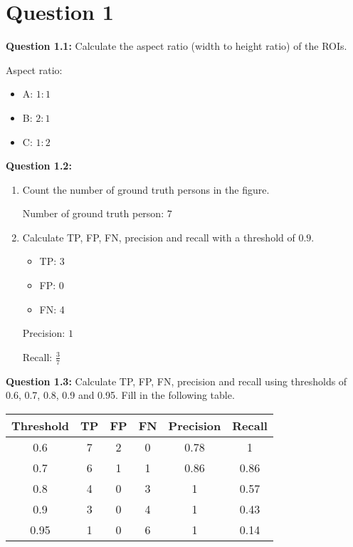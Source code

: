 \documentclass[12pt]{article}
\begin{document}
\maketitle

\section*{Question 1}

\textbf{Question 1.1:} Calculate the aspect ratio (width to height ratio) of the ROIs.

Aspect ratio:
\begin{itemize}
    \item A: $1:1$ 
    \item B: $2:1$
    \item C: $1:2$
\end{itemize}

\textbf{Question 1.2:}
\begin{enumerate}
    \item Count the number of ground truth persons in the figure.
    
    Number of ground truth person: $7$
    
    \item Calculate TP, FP, FN, precision and recall with a threshold of $0.9$.
    \begin{itemize}
        \item TP: 3 
        \item FP: 0 
        \item FN: 4
    \end{itemize}

    Precision: $1$

    Recall: $\frac{3}{7}$
\end{enumerate}

\textbf{Question 1.3:} Calculate TP, FP, FN, precision and recall using thresholds of 0.6, 0.7, 0.8, 0.9 and 0.95. Fill in
the following table.
\begin{table}[h]
    \centering
    \begin{tabular}{|c|c|c|c|c|c|}
    \hline
    Threshold & TP & FP & FN & Precision & Recall \\ \hline
    0.6       & 7  & 2  & 0  & 0.78      & 1      \\ \hline
    0.7       & 6  & 1  & 1  & 0.86      & 0.86   \\ \hline
    0.8       & 4  & 0  & 3  & 1         & 0.57   \\ \hline
    0.9       & 3  & 0  & 4  & 1         & 0.43   \\ \hline
    0.95      & 1  & 0  & 6  & 1         & 0.14   \\ \hline
    \end{tabular}
\end{table}
\end{document}

